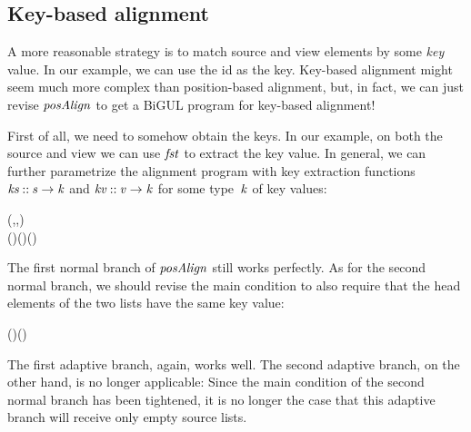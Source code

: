 \subsection{Key-based alignment}

A more reasonable strategy is to match source and view elements by some \emph{key} value.
In our example, we can use the id as the key.
Key-based alignment might seem much more complex than position-based alignment, but, in fact, we can just revise \ensuremath{\Varid{posAlign}} to get a BiGUL program for key-based alignment!

First of all, we need to somehow obtain the keys.
In our example, on both the source and view we can use \ensuremath{\Varid{fst}} to extract the key value.
In general, we can further parametrize the alignment program with key extraction functions \ensuremath{\Varid{ks}\mathbin{::}\Varid{s}\to \Varid{k}} and \ensuremath{\Varid{kv}\mathbin{::}\Varid{v}\to \Varid{k}} for some type~\ensuremath{\Varid{k}} of key values:
\begin{hscode}\SaveRestoreHook
{}%
%
%
%
%
\>[B]{}\<[11]%
\>[11]{}\mathbin{::}{}\<[11E]%
\>[15]{}(\;,\;,\;){}\<[E]%
\\
\>[11]{}\Rightarrow {}\<[11E]%
\>[15]{}(\to {})\to (\to {})\to {}\;\;\to (\to {})\to {}\<[E]%
\ColumnHook
\end{hscode}\resethooks
The first normal branch of \ensuremath{\Varid{posAlign}} still works perfectly.
As for the second normal branch, we should revise the main condition to also require that the head elements of the two lists have the same key value:
\begin{hscode}\SaveRestoreHook
{}%
%
\>[B]{}\lambda (\mathbin{:})\;(\mathbin{:})\to {}\;\equiv {}\;\<[E]%
\ColumnHook
\end{hscode}\resethooks
The first adaptive branch, again, works well.
The second adaptive branch, on the other hand, is no longer applicable:
Since the main condition of the second normal branch has been tightened, it is no longer the case that this adaptive branch will receive only empty source lists.

